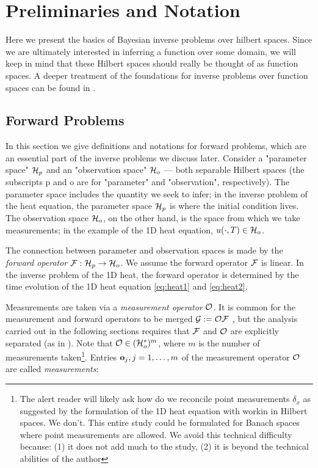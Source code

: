 \section{Preliminaries and Notation}\label{section:prelim}
Here we present the basics of Bayesian inverse problems over hilbert
spaces. Since we are ultimately interested in inferring a function
over some domain, we will keep in mind that these Hilbert spaces
should really be thought of as function spaces. A deeper treatment of
the foundations for inverse problems over function spaces can be found
in \cite{Stuart10}.


\subsection{Forward Problems}\label{subsec:abstract OED}
In this section we give definitions and notations for forward problems,
which are an essential part of the inverse problems we discuss
later. Consider a "parameter space" \(\mathcal{H}_p\) and an "observation
space" \(\mathcal{H}_o\) --- both separable Hilbert spaces (the subscripts p
and o are for "parameter" and "observation", respectively). The
parameter space includes the quantity we seek to infer; in the inverse
problem of the heat equation, the parameter space $\mathcal{H}_p$ is where the
initial condition lives. The observation space $\mathcal{H}_o$, on the other
hand, is the space from which we take measurements; in the example of
the 1D heat equation, $u(\cdot, T) \in \mathcal{H}_o$.

The connection between parameter and observation spaces is made by the
\emph{forward operator} \(\mathcal{F}: \mathcal{H}_p \to \mathcal{H}_o\). We assume the
forward operator \(\mathcal{F}\) is linear. In the inverse problem of the 1D
heat, the forward operator is determined by the time evolution of the
1D heat equation \eqref{eq:heat1} and \eqref{eq:heat2}.

Measurements are taken via a \emph{measurement operator} \(\mathcal{O}\). It
is common for the measurement and forward operators to be merged
\(\mathcal{G} := \mathcal{O} \mathcal{F}\) \cite{AlexanderianGloorGhattas14}, but the
analysis carried out in the following sections requires that \(\mathcal{F}\)
and \(\mathcal{O}\) are explicitly separated (as in
\cite{attia2022stochastic, cvetkovic2023choosing}). Note that \(\mathcal{O}
\in ( \mathcal{H}_o^* )^m\), where \(m\) is the number of measurements
taken\footnote{The alert reader will likely ask how do we reconcile
point measurements $\delta_x$ as suggested by the formulation of the
1D heat equation with workin in Hilbert spaces. We don't. This entire
study could be formulated for Banach spaces where point measurements
are allowed. We avoid this technical difficulty because: (1) it does
not add much to the study, (2) it is beyond the technical abilities of
the author}. Entries \(\mathbf{o}_j, j=1,\dots,m\) of the measurement
operator \(\mathcal{O}\) are called \emph{measurements}:

